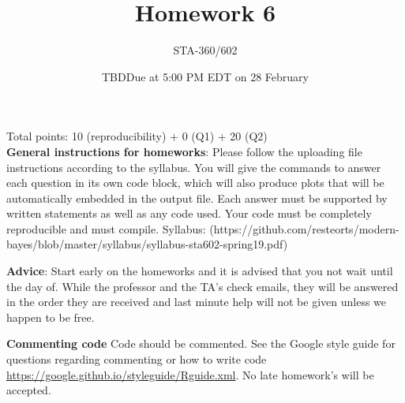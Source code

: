 \documentclass{article}
\begin{document}
\title{Homework 6}
\author{STA-360/602}
\date{TBD}
\date{Due at 5:00 PM EDT on 28 February}
\maketitle

Total points: 10 (reproducibility) + 0 (Q1) + 20 (Q2)\\

\textbf{General instructions for homeworks}: Please follow the uploading file instructions according to the syllabus. You will give the commands to answer each question in its own code block, which will also produce plots that will be automatically embedded in the output file. Each answer must be supported by written statements as well as any code used. Your code must be completely reproducible and must compile. Syllabus: (https://github.com/resteorts/modern-bayes/blob/master/syllabus/syllabus-sta602-spring19.pdf)

\textbf{Advice}: Start early on the homeworks and it is advised that you not wait until the day of. While the professor and the TA's check emails, they will be answered in the order they are received and last minute help will not be given unless we happen to be free.  

\textbf{Commenting code}
Code should be commented. See the Google style guide for questions regarding commenting or how to write 
code \url{https://google.github.io/styleguide/Rguide.xml}. No late homework's will be accepted.
\end{document}
